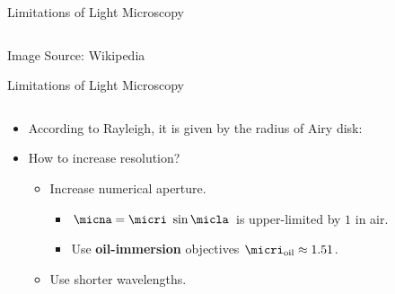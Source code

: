 \begin{frame}[c]{Limitations of Light Microscopy}
\begin{columns}[c,onlytextwidth]
	\end{columns}
	\begin{flushright}
		\tiny
		Image Source: Wikipedia
	\end{flushright}
\end{frame}
\begin{frame}[c]{Limitations of Light Microscopy}
	\begin{columns}[c,onlytextwidth]

		\begin{column}{0.6\textwidth}
			\begin{itemize}
				\item<1-> According to Rayleigh, it is given by the radius of Airy disk:
				      \uncover<2->{
					      \begin{equation*}\label{eq:mic:rayleigh}
						      \micdmin = \micairy = 0.61\frac{\micwl}{\micna}
					      \end{equation*}
				      }
				\item<3-> How to increase resolution?
				      \begin{itemize}
					      \item<4-> Increase numerical aperture.
					            \begin{itemize}
						            \item<5-> $\micna = \micri~ \sin\micla$ is upper-limited by $1$ in air.
						            \item<6-> Use \textbf{oil-immersion} objectives $\micri_{\text{oil}} \approx 1.51$.
					            \end{itemize}
					      \item<7-> Use shorter wavelengths.
				      \end{itemize}
			\end{itemize}
		\end{column}


\end{columns}
\end{frame}
